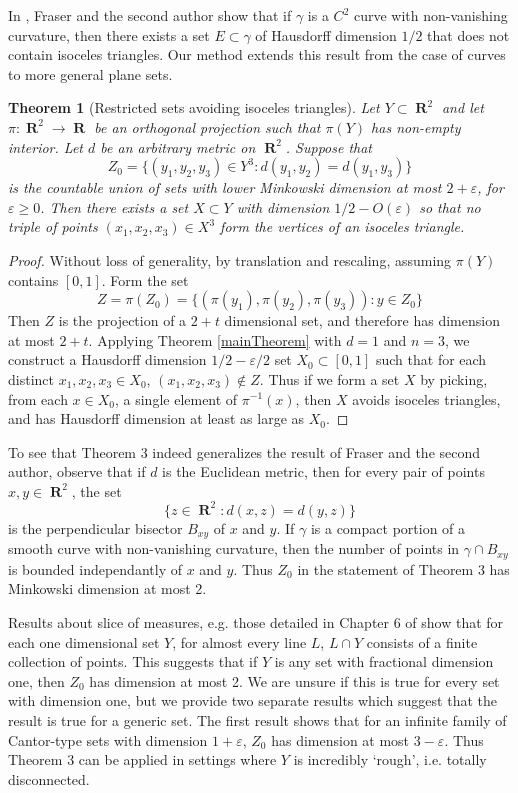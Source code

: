 \documentclass[dvipsnames,letterpaper,12pt]{article}
\numberwithin{equation}{section}
\theoremstyle{plain}
\newtheorem{theorem}{Theorem}
\DeclareMathOperator{\RR}{\mathbf{R}}
\begin{document}
In \cite{MalabikaRob}, Fraser and the second author show that if $\gamma$ is a $C^2$ curve with non-vanishing curvature, then there exists a set $E \subset \gamma$ of Hausdorff dimension $1/2$ that does not contain isoceles triangles. Our method extends this result from the case of curves to more general plane sets.

\begin{theorem}[Restricted sets avoiding isoceles triangles]
	Let $Y \subset \RR^2$ and let $\pi: \RR^2 \to \RR$ be an orthogonal projection such that $\pi(Y)$ has non-empty interior. Let $d$ be an arbitrary metric on $\RR^2$. Suppose that
	\[ Z_0 = \{ (y_1, y_2, y_3) \in Y^3: d(y_1,y_2) = d(y_1,y_3) \} \]
	is the countable union of sets with lower Minkowski dimension at most $2 + \varepsilon$, for $\varepsilon \geq 0$. Then there exists a set $X \subset Y$ with dimension $1/2 - O(\varepsilon)$ so that no triple of points $(x_1, x_2, x_3) \in X^3$ form the vertices of an isoceles triangle.
\end{theorem}
\begin{proof}
	Without loss of generality, by translation and rescaling, assuming $\pi(Y)$ contains $[0,1]$. Form the set
	\[ Z = \pi(Z_0) = \{ (\pi(y_1), \pi(y_2), \pi(y_3)) : y \in Z_0 \} \]
	Then $Z$ is the projection of a $2 + t$ dimensional set, and therefore has dimension at most $2 + t$. Applying Theorem \ref{mainTheorem} with $d = 1$ and $n = 3$, we construct a Hausdorff dimension $1/2 - \varepsilon/2$ set $X_0 \subset [0,1]$ such that for each distinct $x_1,x_2,x_3 \in X_0$, $(x_1,x_2,x_3) \not \in Z$. Thus if we form a set $X$ by picking, from each $x \in X_0$, a single element of $\pi^{-1}(x)$, then $X$ avoids isoceles triangles, and has Hausdorff dimension at least as large as $X_0$.
\end{proof}

To see that Theorem 3 indeed generalizes the result of Fraser and the second author, observe that if $d$ is the Euclidean metric, then for every pair of points $x,y \in \RR^2$, the set
%
\[ \{ z \in \RR^2: d(x,z) = d(y,z) \} \]
%
is the perpendicular bisector $B_{xy}$ of $x$ and $y$. If $\gamma$ is a compact portion of a smooth curve with non-vanishing curvature, then the number of points in $\gamma \cap B_{xy}$ is bounded independantly of $x$ and $y$. Thus $Z_0$ in the statement of Theorem 3 has Minkowski dimension at most 2.

Results about slice of measures, e.g. those detailed in Chapter 6 of \cite{Matilla} show that for each one dimensional set $Y$, for almost every line $L$, $L \cap Y$ consists of a finite collection of points. This suggests that if $Y$ is any set with fractional dimension one, then $Z_0$ has dimension at most 2. We are unsure if this is true for every set with dimension one, but we provide two separate results which suggest that the result is true for a generic set. The first result shows that for an infinite family of Cantor-type sets with dimension $1 + \varepsilon$, $Z_0$ has dimension at most $3 - \varepsilon$. Thus Theorem 3 can be applied in settings where $Y$ is incredibly `rough', i.e. totally disconnected.
\end{document}
